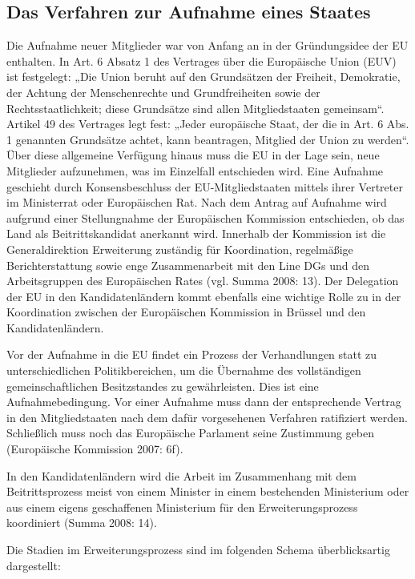 \subsection{Das Verfahren zur Aufnahme eines Staates }
Die Aufnahme neuer Mitglieder war von Anfang an in der Gründungsidee der EU enthalten. In Art. 6 Absatz 1 des Vertrages über die Europäische Union (EUV) ist festgelegt: „Die Union beruht auf den Grundsätzen der Freiheit, Demokratie, der Achtung der Menschenrechte und Grundfreiheiten sowie der Rechtsstaatlichkeit; diese Grundsätze sind allen Mitgliedstaaten gemeinsam“. Artikel 49 des Vertrages legt fest: „Jeder europäische Staat, der die in Art. 6 Abs. 1 genannten Grundsätze achtet, kann beantragen, Mitglied der Union zu werden“. Über diese allgemeine Verfügung hinaus muss die EU in der Lage sein, neue Mitglieder aufzunehmen, was im Einzelfall entschieden wird. Eine Aufnahme geschieht durch Konsensbeschluss der EU-Mitgliedstaaten mittels ihrer Vertreter im Ministerrat oder Europäischen Rat. Nach dem Antrag auf Aufnahme wird aufgrund einer Stellungnahme der Europäischen Kommission entschieden, ob das Land als Beitrittskandidat anerkannt wird. Innerhalb der Kommission ist die Generaldirektion Erweiterung zuständig für Koordination, regelmäßige Berichterstattung sowie enge Zusammenarbeit mit den Line DGs und den Arbeitsgruppen des Europäischen Rates (vgl. Summa 2008: 13). Der Delegation der EU in den Kandidatenländern kommt ebenfalls eine wichtige Rolle zu in der Koordination zwischen der Europäischen Kommission in Brüssel und den Kandidatenländern.\par
Vor der Aufnahme in die EU findet ein Prozess der Verhandlungen statt zu unterschiedlichen Politikbereichen, um die Übernahme des vollständigen gemeinschaftlichen Besitzstandes zu gewährleisten. Dies ist eine Aufnahmebedingung. Vor einer Aufnahme muss dann der entsprechende Vertrag in den Mitgliedstaaten nach dem dafür vorgesehenen Verfahren ratifiziert werden. Schließlich muss noch das Europäische Parlament seine Zustimmung geben (Europäische Kommission 2007: 6f).
\par
In den Kandidatenländern wird die Arbeit im Zusammenhang mit dem Beitrittsprozess meist von einem Minister in einem bestehenden Ministerium oder aus einem eigens geschaffenen Ministerium für den Erweiterungsprozess koordiniert (Summa 2008: 14).\par
Die Stadien im Erweiterungsprozess sind im folgenden Schema überblicksartig dargestellt:
